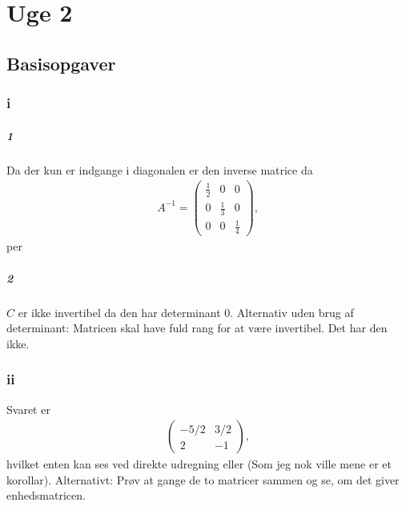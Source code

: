 
\chapter{Uge 2}

	\section{Basisopgaver}

		\subsection{i}

			\paragraph{1} Da der kun er indgange i diagonalen er den inverse matrice da
				\begin{align*}
					A^{-1}=\left(\begin{array}{lll}{\frac{1}{2}} & {0} & {0} \\ {0} & {\frac{1}{3}} & {0} \\ {0} & {0} & {\frac{1}{4}}\end{array}\right),
				\end{align*} 
			per \cite[Sætning 2.4.12]{hesselholt2017}

			\paragraph{2} $C$ er ikke invertibel da den har determinant $0$. Alternativ uden brug af determinant: Matricen skal have fuld rang for at være invertibel. Det har den ikke.

		\subsection{ii}

			Svaret er 
				\begin{align*}
					\left(\begin{array}{cc}{-5 / 2} & {3 / 2} \\ {2} & {-1}\end{array}\right),
				\end{align*} 
			hvilket enten kan ses ved direkte udregning eller \cite[Eksempel 3.4.3]{hesselholt2017} (Som jeg nok ville mene er et korollar). Alternativt: Prøv at gange de to matricer sammen og se, om det giver enhedsmatricen.

